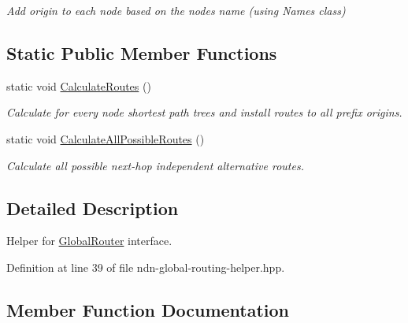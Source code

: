 \begin{DoxyCompactItemize}
\begin{DoxyCompactList}\small\item\em Add origin to each node based on the node\textquotesingle{}s name (using Names class) \end{DoxyCompactList}\end{DoxyCompactItemize}
\subsection*{Static Public Member Functions}
\begin{DoxyCompactItemize}
\item 
static void \hyperlink{classns3_1_1ndn_1_1GlobalRoutingHelper_abf4e3691826eec2835f04320947319e3}{Calculate\+Routes} ()
\begin{DoxyCompactList}\small\item\em Calculate for every node shortest path trees and install routes to all prefix origins. \end{DoxyCompactList}\item 
static void \hyperlink{classns3_1_1ndn_1_1GlobalRoutingHelper_ae33fb34aa3ba3485a01932e5dc17eb23}{Calculate\+All\+Possible\+Routes} ()
\begin{DoxyCompactList}\small\item\em Calculate all possible next-\/hop independent alternative routes. \end{DoxyCompactList}\end{DoxyCompactItemize}


\subsection{Detailed Description}
Helper for \hyperlink{classns3_1_1ndn_1_1GlobalRouter}{Global\+Router} interface. 

Definition at line 39 of file ndn-\/global-\/routing-\/helper.\+hpp.



\subsection{Member Function Documentation}
